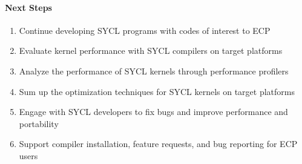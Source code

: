 \paragraph{Next Steps}

\begin{enumerate}
\item Continue developing SYCL programs with codes of interest to ECP
\item Evaluate kernel performance with SYCL compilers on target platforms
\item Analyze the performance of SYCL kernels through performance profilers
\item Sum up the optimization techniques for SYCL kernels on target platforms
\item Engage with SYCL developers to fix bugs and improve performance and portability 
\item Support compiler installation, feature requests, and bug reporting for ECP users
\end{enumerate}

